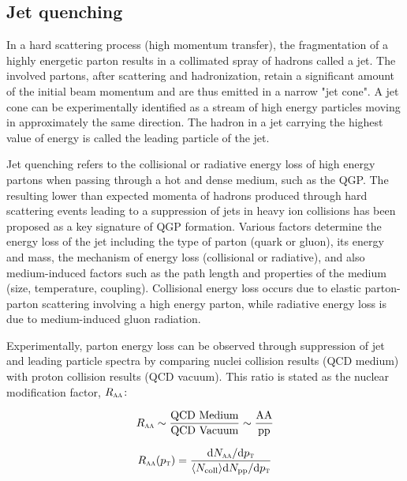 \subsection{Jet quenching}

In a hard scattering process (high momentum transfer), the fragmentation of a highly energetic parton results in a collimated spray of hadrons called a
jet. The involved partons, after scattering and hadronization, retain a significant amount of the initial beam momentum and are thus emitted in a narrow
"jet cone". A jet cone can be experimentally identified as a stream of high energy particles moving in approximately the same direction. The hadron in a
jet carrying the highest value of energy is called the leading particle of the jet.

Jet quenching refers to the collisional or radiative energy loss of high energy partons when passing through a hot and dense medium, such as the QGP. The
resulting lower than expected momenta of hadrons produced through hard scattering events leading to a suppression of jets in heavy ion collisions has been
proposed as a key signature of QGP formation\cite{Bjorken:1982}. Various factors determine the energy loss of the jet including the type of parton (quark
or gluon), its energy and mass, the mechanism of energy loss (collisional or radiative), and also medium-induced factors such as the path length and properties
of the medium (size, temperature, coupling). Collisional energy loss occurs due to elastic parton-parton scattering involving a high energy parton, while
radiative energy loss is due to medium-induced gluon radiation.

Experimentally, parton energy loss can be observed through suppression of jet and leading particle spectra by comparing nuclei collision results (QCD medium)
with proton collision results (QCD vacuum). This ratio is stated as the nuclear modification factor, $R_{\textnormal{\sc aa}}\colon$

\begin{equation}
    R_{\textnormal{\sc aa}} \sim \frac{\textnormal {QCD Medium}}{\textnormal{QCD Vacuum}}\sim \frac{\textnormal{AA}}{\textnormal{pp}}
    \label{eq:RAA1}
\end{equation}

\begin{equation}
    R_{\textnormal{\sc aa}} (p_{\textnormal{\sc t}}) = \frac{\textnormal{d}N_{\textnormal{\sc aa}}/\textnormal{d}p_{\textnormal{\sc t}}}{\langle N_{\textnormal{coll}}\rangle\textnormal{d}N_{\textnormal {pp}}/\textnormal{d}p_{\textnormal{\sc t}}}
    \label{eq:RAA2}
\end{equation}

